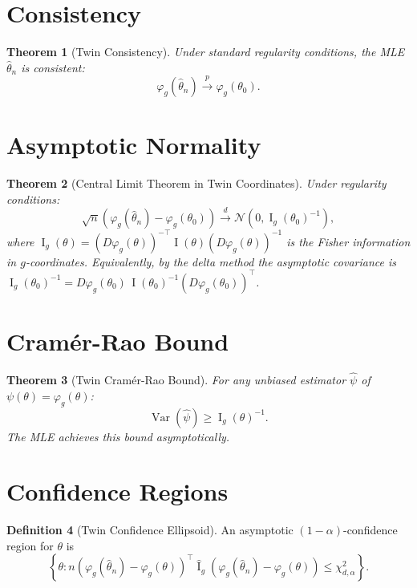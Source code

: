 \documentclass[11pt,twoside]{book}
\theoremstyle{plain}
\newtheorem{theorem}{Theorem}[chapter]
\theoremstyle{definition}
\newtheorem{definition}[theorem]{Definition}
\theoremstyle{remark}
\DeclareMathOperator{\Var}{Var}
\DeclareMathOperator{\Fisher}{I}
\begin{document}
\section{Consistency}
\label{sec:consistency}

\begin{theorem}[Twin Consistency]
    Under standard regularity conditions, the MLE $\hat{\theta}_n$ is consistent:
    \[
    \varphi_g(\hat{\theta}_n) \stackrel{p}{\to} \varphi_g(\theta_0).
    \]
\end{theorem}

\section{Asymptotic Normality}
\label{sec:asymp_normality}

\begin{theorem}[Central Limit Theorem in Twin Coordinates]
    \label{thm:twin_clt}
    Under regularity conditions:
    \[
    \sqrt{n}(\varphi_g(\hat{\theta}_n) - \varphi_g(\theta_0)) \stackrel{d}{\to} \mathcal{N}(0, \Fisher_g(\theta_0)^{-1}),
    \]
    where $\Fisher_g(\theta) = (D\varphi_g(\theta))^{-\top} \Fisher(\theta) (D\varphi_g(\theta))^{-1}$ is the Fisher information in $g$-coordinates. Equivalently, by the delta method the asymptotic covariance is $\Fisher_g(\theta_0)^{-1} = D\varphi_g(\theta_0)\, \Fisher(\theta_0)^{-1} (D\varphi_g(\theta_0))^\top$.
\end{theorem}

\section{Cramér-Rao Bound}
\label{sec:cramer_rao}

\begin{theorem}[Twin Cramér-Rao Bound]
    For any unbiased estimator $\hat{\psi}$ of $\psi(\theta) = \varphi_g(\theta)$:
    \[
    \Var(\hat{\psi}) \geq \Fisher_g(\theta)^{-1}.
    \]
    The MLE achieves this bound asymptotically.
\end{theorem}

\section{Confidence Regions}
\label{sec:confidence}

\begin{definition}[Twin Confidence Ellipsoid]
    An asymptotic $(1-\alpha)$-confidence region for $\theta$ is
    \[
    \left\{\theta : n (\varphi_g(\hat{\theta}_n) - \varphi_g(\theta))^\top \hat{\Fisher}_g (\varphi_g(\hat{\theta}_n) - \varphi_g(\theta)) \leq \chi^2_{d,\alpha}\right\}.
    \]
\end{definition}
\end{document}
